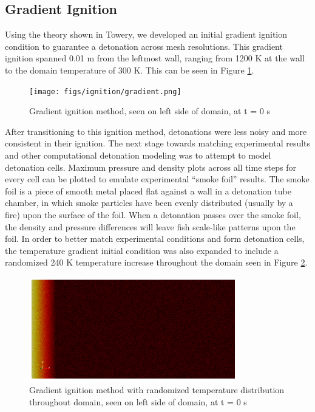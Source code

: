\subsection{Gradient Ignition}
Using the theory shown in Towery\cite{towery2}, we developed an initial gradient ignition condition to guarantee a detonation across mesh resolutions. This gradient ignition spanned 0.01 m from the leftmost wall, ranging from 1200 K at the wall to the domain temperature of 300 K. This can be seen in Figure \ref{fig:gradig}. 
\begin{figure}[h]
\centering
\texttt{[image: figs/ignition/gradient.png]}
\caption{Gradient ignition method, seen on left side of domain, at t = 0 s}
\label{fig:gradig}
\end{figure}%
\noindent After transitioning to this ignition method, detonations were less noisy and more consistent in their ignition. The next stage towards matching experimental results and other computational detonation modeling was to attempt to model detonation cells. Maximum pressure and density plots across all time steps for every cell can be plotted to emulate experimental ``smoke foil'' results. The smoke foil is a piece of smooth metal placed flat against a wall in a detonation tube chamber, in which smoke particles have been evenly distributed (usually by a fire) upon the surface of the foil. When a detonation passes over the smoke foil, the density and pressure differences will leave fish scale-like patterns upon the foil. 
In order to better match experimental conditions and form detonation cells, the temperature gradient initial condition was also expanded to include a randomized 240 K temperature increase throughout the domain seen in Figure \ref{fig:gradrand}. 
\begin{figure}[h]
\centering
\includegraphics[width=0.8\textwidth]{figs/ignition/randgrad.png}
\caption{Gradient ignition method with randomized temperature distribution throughout domain, seen on left side of domain, at t = 0 s}
\label{fig:gradrand}
\end{figure}%
